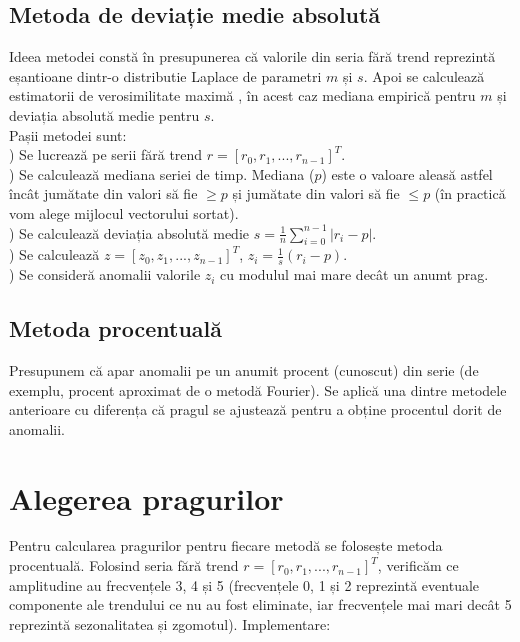 \subsection{Metoda de deviație medie absolută}
\noindent Ideea metodei constă în presupunerea că valorile din seria fără trend reprezintă eșantioane dintr-o distributie Laplace de parametri $m$ 
și $s$. Apoi se calculează estimatorii de verosimilitate maximă \cite{laplace_mle}, în acest caz mediana empirică pentru $m$ 
și deviația absolută medie pentru $s$. \\ 

\noindent Pașii metodei sunt:\\

) Se lucrează pe serii fără trend $r = [r_0, r_1, ..., r_{n-1}]^T$.\\

) Se calculează mediana seriei de timp. Mediana ($p$) este o valoare aleasă astfel încât jumătate din valori să fie $\ge p$ și jumătate din valori să 
fie $\le p$ (în practică vom alege mijlocul vectorului sortat).\\

) Se calculează deviația absolută medie $s = \frac{1}{n}\sum\limits_{i=0}^{n-1}|r_i-p|$.\\

) Se calculează $z = [z_0, z_1, ..., z_{n-1}]^T$, $z_i = \frac{1}{s}(r_i-p)$.\\

) Se consideră anomalii valorile $z_i$ cu modulul mai mare decât un anumt prag.

\subsection{Metoda procentuală}
\noindent Presupunem că apar anomalii pe un anumit procent (cunoscut) din serie (de exemplu, procent aproximat de o metodă Fourier). 
Se aplică una dintre metodele anterioare cu diferența că pragul se ajustează pentru a obține procentul dorit de anomalii.

\section{Alegerea pragurilor}

\noindent Pentru calcularea pragurilor pentru fiecare metodă se folosește metoda procentuală. Folosind seria fără trend 
$r = [r_0, r_1, ..., r_{n-1}]^T$, verificăm ce amplitudine au frecvențele 3, 4 și 5 (frecvențele 0, 1 și 2 reprezintă eventuale componente ale 
trendului ce nu au fost eliminate, iar frecvențele mai mari decât 5 reprezintă sezonalitatea și zgomotul). Implementare:\\

